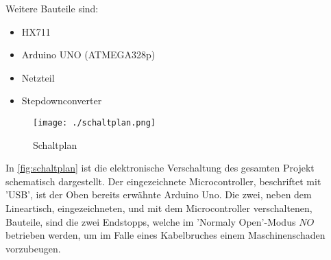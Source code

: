 Weitere Bauteile sind:
\begin{itemize}
    \item HX711
    \item Arduino UNO (ATMEGA328p)
    \item Netzteil
    \item Stepdownconverter
\end{itemize}

\begin{figure}[H]
    \centering
    \texttt{[image: ./schaltplan.png]}
    \caption{Schaltplan}
    \label{fig:schaltplan}
\end{figure}

In \autoref{fig:schaltplan} ist die elektronische Verschaltung des gesamten Projekt schematisch dargestellt. Der eingezeichnete Microcontroller, beschriftet mit 'USB', ist der Oben bereits erwähnte Arduino Uno. Die zwei, neben dem Lineartisch, eingezeichneten, und mit dem Microcontroller verschaltenen, Bauteile, sind die zwei Endstopps, welche im 'Normaly Open'-Modus $NO$ betrieben werden, um im Falle eines Kabelbruches einem Maschinenschaden vorzubeugen.